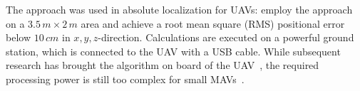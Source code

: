 The approach was used in absolute localization for UAVs: \citet{blosch2010vision} employ the approach on a $3.5\,m \times 2\,m$ area and achieve a root mean square (RMS) positional error below $10\,cm$ in $x,y,z$-direction. Calculations are executed on a powerful ground station, which is connected to the UAV with a USB cable. While subsequent research has brought the algorithm on board of the UAV~\cite{achtelik2011onboard}, the required processing power is still too complex for small MAVs~\cite{de2009design}.  